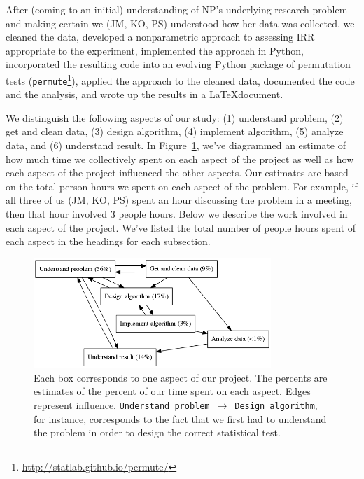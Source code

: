 \documentclass[]{article}
\begin{document}
After (coming to an initial) understanding of NP's underlying research problem
and making certain we (JM, KO, PS) understood how her data was collected, we
cleaned the data, developed a nonparametric approach to assessing IRR
appropriate to the experiment, implemented the approach in Python, incorporated
the resulting code into an evolving Python package of permutation tests
(\texttt{permute}\footnote{\url{http://statlab.github.io/permute/}}), applied
the approach to the cleaned data, documented the code and the analysis, and
wrote up the results in a \LaTeX document. 

We distinguish the following aspects of our study:
(1) understand problem,
(2) get and clean data,
(3) design algorithm,
(4) implement algorithm,
(5) analyze data, and
(6) understand result.
In Figure~\ref{fig:work_process}, we've diagrammed an estimate of how much time
we collectively spent on each aspect of the project as well as how each aspect
of the project influenced the other aspects.
Our estimates are based on the total person hours we spent on each aspect of
the problem.
For example, if all three of us (JM, KO, PS) spent an hour discussing the
problem in a meeting, then that hour involved 3 people hours.
Below we describe the work involved in each aspect of the project.
We've listed the total number of people hours spent of each aspect in the
headings for each subsection.

\begin{figure}[h]
  \centering
    \includegraphics[width=0.8\textwidth]{work_process.png}
  \caption{
  \small
    Each box corresponds to one aspect of our project.
    The percents are estimates of the percent of our time spent on each aspect.
    Edges represent influence.
    \texttt{Understand problem}~$\to$~\texttt{Design algorithm}, for instance,
    corresponds to the fact that we first had to understand the problem
    in order to design the correct statistical test.\label{fig:work_process}}
\end{figure}
\end{document}
